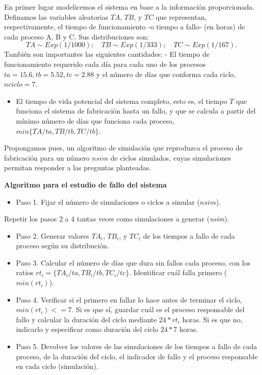 \documentclass[
]{book}
\providecommand{\tightlist}{%
  \setlength{\itemsep}{0pt}\setlength{\parskip}{0pt}}
\newenvironment{silverbox}{
  \definecolor{shadecolor}{rgb}{192, 192, 192}  
  \color{black}
  \begin{shaded}}
 {\end{shaded}}
\theoremstyle{definition}
\theoremstyle{definition}
\theoremstyle{definition}
\theoremstyle{definition}
\theoremstyle{remark}
\begin{document}
En primer lugar modelicemos el sistema en base a la información proporcionada. Definamos las variables aleatorias \(TA\), \(TB\), y \(TC\) que representan, respectivamente, el tiempo de funcionamiento -o tiempo a fallo- (en horas) de cada proceso A, B y C. Sus distribuciones son: \[TA \sim Exp(1/1000); \quad TB \sim Exp(1/333); \quad TC \sim Exp(1/167).\] También son importantes las siguientes cantidades: - El tiempo de funcionamiento requerido cada día para cada uno de los procesos \(ta=15.6, tb=5.52, tc=2.88\) y el número de días que conforma cada ciclo, \(nciclo=7\).

\begin{itemize}
\tightlist
\item
  El tiempo de vida potencial del sistema completo, esto es, el tiempo \(T\) que funciona el sistema de fabricación hasta un fallo, y que se calcula a partir del mínimo número de días que funciona cada proceso, \(min \{TA/ta,TB/tb,TC/tb\}\).
\end{itemize}

Propongamos pues, un algoritmo de simulación que reproduzca el proceso de fabricación para un número \(nsim\) de ciclos simulados, cuyas simulaciones permitan responder a las preguntas planteadas.

\begin{silverbox}

\textbf{Algoritmo para el estudio de fallo del sistema}

\begin{itemize}
\tightlist
\item
  Paso 1. Fijar el número de simulaciones o ciclos a simular (\(nsim\)).
\end{itemize}

Repetir los pasos 2 a 4 tantas veces como simulaciones a generar (\emph{nsim}).

\begin{itemize}
\item
  Paso 2. Generar valores \(TA_i\), \(TB_i\), y \(TC_i\) de los tiempos a fallo de cada proceso según su distribución.
\item
  Paso 3. Calcular el número de días que dura sin fallos cada proceso, con los ratios \(rt_i=\{TA_i/ta, TB_i/tb, TC_i/tc\}\). Identificar cuál falla primero (\(min(rt_i)\)).
\item
  Paso 4. Verificar si el primero en fallar lo hace antes de terminar el ciclo, \(min(rt_i)<=7\). Si es que sí, guardar cuál es el proceso responsable del fallo y calcular la duración del ciclo mediante \(24*rt_i\) horas. Si es que no, indicarlo y especificar como duración del ciclo \(24*7\) horas.
\item
  Paso 5. Devolver los valores de las simulaciones de los tiempos a fallo de cada proceso, de la duración del ciclo, el indicador de fallo y el proceso responsable en cada ciclo (simulación).
\end{itemize}

\end{silverbox}
\end{document}
